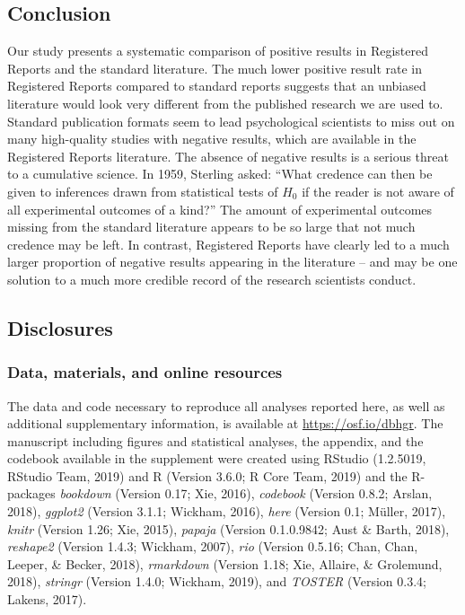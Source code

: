 \documentclass[british,,jou,floatsintext]{apa6}
\begin{document}
\hypertarget{conclusion}{%
\subsection{Conclusion}\label{conclusion}}

Our study presents a systematic comparison of positive results in Registered Reports and the standard literature. The much lower positive result rate in Registered Reports compared to standard reports suggests that an unbiased literature would look very different from the published research we are used to. Standard publication formats seem to lead psychological scientists to miss out on many high-quality studies with negative results, which are available in the Registered Reports literature. The absence of negative results is a serious threat to a cumulative science. In 1959, Sterling asked: \enquote{What credence can then be given to inferences drawn from statistical tests of \(H_0\) if the reader is not aware of all experimental outcomes of a kind?} The amount of experimental outcomes missing from the standard literature appears to be so large that not much credence may be left. In contrast, Registered Reports have clearly led to a much larger proportion of negative results appearing in the literature -- and may be one solution to a much more credible record of the research scientists conduct.

\hypertarget{disclosures}{%
\subsection{Disclosures}\label{disclosures}}

\hypertarget{data-materials-and-online-resources}{%
\subsubsection{Data, materials, and online resources}\label{data-materials-and-online-resources}}

The data and code necessary to reproduce all analyses reported here, as well as additional supplementary information, is available at \url{https://osf.io/dbhgr}. The manuscript including figures and statistical analyses, the appendix, and the codebook available in the supplement were created using RStudio (1.2.5019, RStudio Team, 2019) and R (Version 3.6.0; R Core Team, 2019) and the R-packages \emph{bookdown} (Version 0.17; Xie, 2016), \emph{codebook} (Version 0.8.2; Arslan, 2018), \emph{ggplot2} (Version 3.1.1; Wickham, 2016), \emph{here} (Version 0.1; Müller, 2017), \emph{knitr} (Version 1.26; Xie, 2015), \emph{papaja} (Version 0.1.0.9842; Aust \& Barth, 2018), \emph{reshape2} (Version 1.4.3; Wickham, 2007), \emph{rio} (Version 0.5.16; Chan, Chan, Leeper, \& Becker, 2018), \emph{rmarkdown} (Version 1.18; Xie, Allaire, \& Grolemund, 2018), \emph{stringr} (Version 1.4.0; Wickham, 2019), and \emph{TOSTER} (Version 0.3.4; Lakens, 2017).
\end{document}
